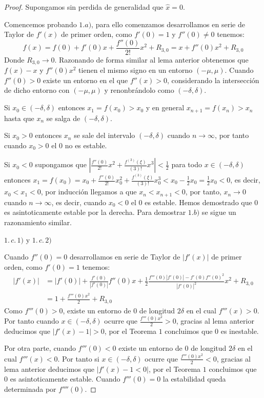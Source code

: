 \documentclass[12pt,a4paper]{report}
\theoremstyle{definition}
\begin{document}
\begin{proof}
Supongamos sin perdida de generalidad que $\hat{x} = 0$.

Comencemos probando $1.a)$, para ello comenzamos desarrollamos en serie de Taylor de $f'(x)$ de primer orden, como $f'(0) = 1$ y $f''(0) \neq 0$ tenemos:
$$
f(x) = f(0) + f'(0)x + \frac{f''(0)}{2!}x^2 +  R_{3,0} = x + f''(0)x^2  + R_{3,0}
$$
%
Donde $R_{3,0} \to 0$. Razonando de forma similar al lema anterior obtenemos que  $f(x) - x$ y $f''(0)x^2$ tienen el mismo signo en un entorno $(-\mu,\mu)$.
Cuando $f''(0) > 0$ existe un entorno en el que $f''(x) > 0$, considerando la intersección de dicho entorno con $(-\mu,\mu)$ y renonbrándolo como $(-\delta,\delta)$.

Si $x_0 \in (-\delta,\delta)$ entonces $x_1 = f(x_0) > x_0$ y en general $x_{n+1} = f(x_n) > x_n$ hasta que $x_n$ se salga de $(-\delta,\delta)$. 

Si $x_0 > 0$ entonces $x_n$ se sale del intervalo $(-\delta,\delta)$ cuando $n \to \infty$, por tanto cuando $x_0 > 0$ el $0$ no es estable.

Si $x_0 < 0$ supongamos que $|\frac{f''(0)}{2!}x^2 + \frac{f^{(3)}(\xi)}{(3)!}x^{3} | < \frac{1}{2}$ para todo $x \in (-\delta,\delta)$ entonces $x_1 = f(x_0) = x_0 + \frac{f''(0)}{2!}x_{0}^2 + \frac{f^{(3)}(\xi)}{(3)!}x_{0}^{3} < x_0 - \frac{1}{2} x_0  =\frac{1}{2} x_0  < 0$, es decir, $x_0 < x_1 < 0$, por inducción llegamos a que $x_n < x_{n + 1} < 0$, por tanto,  $x_n \to 0$ cuando $n \to \infty$, es decir, cuando $x_0 < 0$ el $0$ es estable. Hemos demostrado que $0$ es asintoticamente estable por la derecha. Para demostrar $1.b)$ se sigue un razonamiento similar.

$1.\,c.\,1) \text{ y } 1.\,c.\,2)$

Cuando $f''(0) = 0$ desarrollamos en serie de Taylor de $|f'(x)|$ de primer orden, como $f'(0) = 1$  tenemos:
\[
\begin{split}
|f'(x)| &= |f'(0)| + \frac{f'(0)}{|f'(0)|} f''(0)x  + \frac{1}{2} \frac{f'''(0) |f'(0)| - f'(0) f''(0)^2}{|f'(0)|^2} x^2  +   R_{3,0} \\& = 1 + \frac{f'''(0)x^2}{2} +  R_{3,0}
\end{split}
\]
%
Como $f'''(0) > 0$, existe un entorno de $0$ de longitud $2 \delta$ en el cual $f'''(x) > 0$. Por tanto cuando $x \in (- \delta, \delta)$ ocurre que $\frac{f'''(0)x^2}{2} > 0$, gracias al lema anterior deducimos que $|f'(x) - 1 |> 0$, por el Teorema $1$ concluimos que $0$ es inestable.


Por otra parte, cuando $f'''(0) < 0$ existe un entorno de $0$ de longitud $2 \delta$ en el cual $f'''(x) < 0$. Por tanto si $x \in (-\delta,\delta)$ ocurre que $\frac{f'''(0)x^2}{2} < 0$, gracias al lema anterior deducimos que $|f'(x) - 1 < 0|$, por el Teorema $1$ concluimos que $0$ es asintoticamente estable. Cuando $f'''(0) = 0$ la estabilidad queda determinada por $f''''(0)$.


\end{proof}
\end{document}

